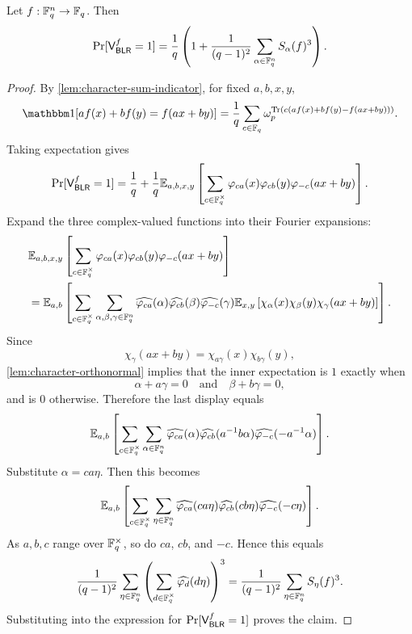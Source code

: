 \begin{lemma}
\label{lem:exact-blr-acceptance}
\leanok
Let $f:{\mathbb F}_q^n\to{\mathbb F}_q$.
Then
\[
    \Pr[\mathsf{V}_{\mathsf{BLR}}^f=1]
    = \frac{1}{q}\left(1+\frac{1}{(q-1)^2}
        \sum_{\alpha\in{\mathbb F}_q^n} S_\alpha(f)^3
    \right).
\]
\end{lemma}

\begin{proof}\leanok
By \cref{lem:character-sum-indicator}, for fixed $a,b,x,y$,
\[
    \ind[a f(x)+b f(y)=f(ax+by)]
    =\frac{1}{q}\sum_{c\in\bbF_q}
        \omega_p^{\Tr(c(a f(x)+b f(y)-f(ax+by)))}.
\]
Taking expectation gives
\[
    \Pr[\mathsf{V}_{\mathsf{BLR}}^f=1]
    =\frac{1}{q}+\frac{1}{q}{\mathbb E}_{a,b,x,y}
        \left[\sum_{c\in{\mathbb F}_q^\times}
        {\varphi}_{ca}(x){\varphi}_{cb}(y)
        {\varphi}_{-c}(ax+by)
        \right].
\]
Expand the three complex-valued functions into their Fourier expansions:
\begin{align*}
&{\mathbb E}_{a,b,x,y}
        \left[\sum_{c\in{\mathbb F}_q^\times}
        {\varphi}_{ca}(x){\varphi}_{cb}(y)
        {\varphi}_{-c}(ax+by)
        \right] \\
&={\mathbb E}_{a,b}\left[\sum_{c\in{\mathbb F}_q^\times}
    \sum_{\alpha,\beta,\gamma\in{\mathbb F}_q^n}
    \widehat{{\varphi}_{ca}}(\alpha)
    \widehat{{\varphi}_{cb}}(\beta)
    \widehat{{\varphi}_{-c}}(\gamma)
    {\mathbb E}_{x,y}\left[
        \chi_\alpha(x)\chi_\beta(y)\chi_\gamma(ax+by)
    \right]
\right].
\end{align*}
Since
\[
    \chi_\gamma(ax+by)=\chi_{a\gamma}(x)\chi_{b\gamma}(y),
\]
\cref{lem:character-orthonormal} implies that the inner expectation is $1$ exactly when
\[
    \alpha+a\gamma=0
    \quad\text{and}\quad
    \beta+b\gamma=0,
\]
and is $0$ otherwise. Therefore the last display equals
\[
    {\mathbb E}_{a,b}\left[\sum_{c\in{\mathbb F}_q^\times}
    \sum_{\alpha\in{\mathbb F}_q^n}
    \widehat{{\varphi}_{ca}}(\alpha)
    \widehat{{\varphi}_{cb}}(a^{-1}b\alpha)
    \widehat{{\varphi}_{-c}}(-a^{-1}\alpha)
    \right].
\]
Substitute $\alpha=ca\eta$. Then this becomes
\[
    {\mathbb E}_{a,b}\left[\sum_{c\in{\mathbb F}_q^\times}
    \sum_{\eta\in{\mathbb F}_q^n}
    \widehat{{\varphi}_{ca}}(ca\eta)
    \widehat{{\varphi}_{cb}}(cb\eta)
    \widehat{{\varphi}_{-c}}(-c\eta)
    \right].
\]
As $a,b,c$ range over ${\mathbb F}_q^\times$, so do $ca$, $cb$, and $-c$. Hence this equals
\[
    \frac{1}{(q-1)^2}
    \sum_{\eta\in{\mathbb F}_q^n}
    \left(\sum_{d\in{\mathbb F}_q^\times}
        \widehat{{\varphi}_{d}}(d\eta)
    \right)^3
    =\frac{1}{(q-1)^2}\sum_{\eta\in{\mathbb F}_q^n}S_\eta(f)^3.
\]
Substituting into the expression for $\Pr[\mathsf{V}_{\mathsf{BLR}}^f=1]$ proves the claim.
\end{proof}

